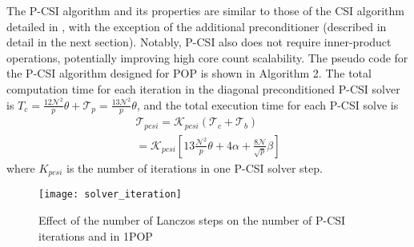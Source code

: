 The P-CSI algorithm and its properties are similar to those of the CSI
algorithm detailed in \cite{hu2013scalable}, with the exception of the
additional preconditioner (described in detail in the next
section).  Notably, P-CSI also does not require inner-product operations, potentially improving high core count scalability.
The pseudo code for the P-CSI algorithm designed for POP is shown in Algorithm 2.
The total computation time for each iteration in the diagonal preconditioned P-CSI solver is $T_c =\frac{12\mathcal{N}^2}{p}\theta+\mathcal{T}_p =\frac{13\mathcal{N}^2}{p}\theta$,
and the total execution time for each P-CSI solve is
\begin{eqnarray}
\label{t_psi}
\mathcal{T}_{pcsi} = \mathcal{K}_{pcsi}(\mathcal{T}_c + \mathcal{T}_b ) \nonumber \\
= \mathcal{K}_{pcsi}[13\frac{\mathcal{N}^2}{p}\theta+ 4\alpha + \frac{8\mathcal{N}}{ \sqrt{p}}\beta]
\end{eqnarray}
where $K_{pcsi}$ is the number of iterations in one P-CSI solver step.
\begin {figure}[!t]
\begin{center}
\texttt{[image: solver\_iteration]}
\end{center}
\vspace{-.2in}
\caption []{Effect of the number of Lanczos steps on the number of P-CSI iterations and in 1\degree\space POP \label {fig:iter}}
\end {figure}

